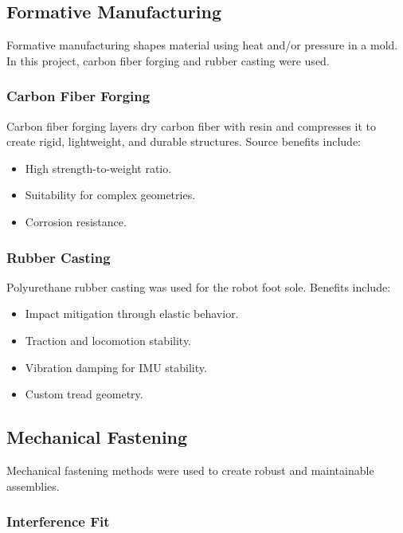 \subsection{Formative Manufacturing}

Formative manufacturing shapes material using heat and/or pressure in a mold. In this project, carbon fiber forging and rubber casting were used.

\subsubsection*{Carbon Fiber Forging}

Carbon fiber forging layers dry carbon fiber with resin and compresses it to create rigid, lightweight, and durable structures. Source benefits include:
\begin{itemize}
    \item High strength-to-weight ratio.
    \item Suitability for complex geometries.
    \item Corrosion resistance.
\end{itemize}

\subsubsection*{Rubber Casting}

Polyurethane rubber casting was used for the robot foot sole. Benefits include:
\begin{itemize}
    \item Impact mitigation through elastic behavior.
    \item Traction and locomotion stability.
    \item Vibration damping for IMU stability.
    \item Custom tread geometry.
\end{itemize}

\subsection{Mechanical Fastening}

Mechanical fastening methods were used to create robust and maintainable assemblies.

\subsubsection*{Interference Fit}


